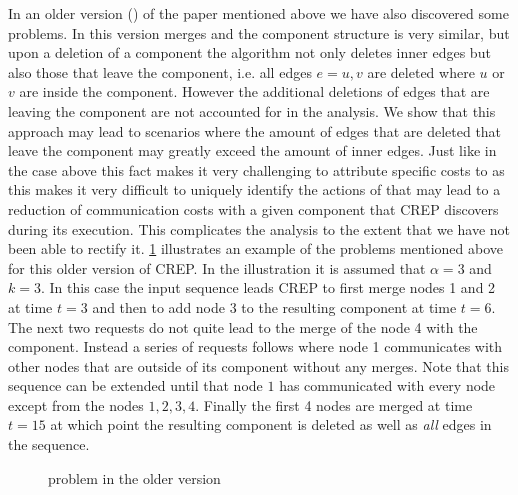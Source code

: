 \documentclass[xcolor=dvipsnames, tikz, 12pt]{article}
\newcommand{\nl}{\newline}
\newcommand{\crep}{C{\scriptsize REP}}
\newcommand{\opt}{\text{O{\scriptsize PT}}}
\newcommand{\request}[3]{\draw (axis cs:#3,#1) -- node[left]{} (axis cs:#3,#2);}
\theoremstyle{definition}
\begin{document}
	In an older version (\cite{Avin2015}) of the paper mentioned above we have also discovered some problems. In this version merges and the component structure is very similar, but upon a deletion of a component the algorithm not only deletes inner edges but also those that leave the component, i.e. all edges $e={u,v}$ are deleted where $u$ or $v$ are inside the component. However the additional deletions of edges that are leaving the component are not accounted for in the analysis. We show that this approach may lead to scenarios where the amount of edges that are deleted that leave the component may greatly exceed the amount of inner edges. Just like in the case above this fact makes it very challenging to attribute specific costs to \opt{} as this makes it very difficult to uniquely identify the actions of \opt{} that may lead to a reduction of communication costs with a given component that \crep{} discovers during its execution. This complicates the analysis to the extent that we have not been able to rectify it.\nl
	\cref{exOldCrep} illustrates an example of the problems mentioned above for this older version of \crep{}. In the illustration it is assumed that $\alpha=3$ and $k=3$. In this case the input sequence leads \crep{} to first merge nodes 1 and 2 at time $t=3$ and then to add node 3 to the resulting component at time $t= 6$. The next two requests do not quite lead to the merge of the node 4 with the component. Instead a series of requests follows where node 1 communicates with other nodes that are outside of its component without any merges. Note that this sequence can be extended until that node $1$ has communicated with every node except from the nodes $1,2,3,4$. Finally the first 4 nodes are merged at time $t=15$ at which point the resulting component is deleted as well as \textit{all} edges in the sequence. 


\begin{figure}
	\caption{problem in the older version}\label{exOldCrep}
	
\end{figure}
	
\end{document}
